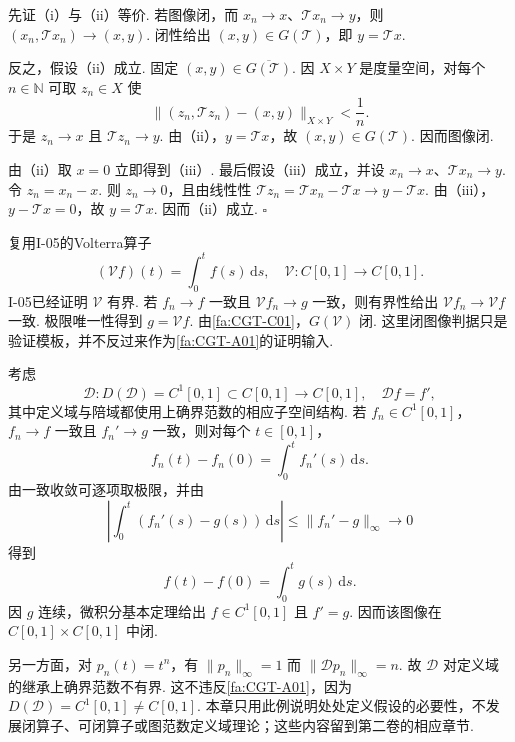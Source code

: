\begin{FAProof}
先证（i）与（ii）等价. 若图像闭，而 \(\displaystyle x_n\to x\)、\(\displaystyle \mathcal T x_n\to y\)，则 \(\displaystyle (x_n,\mathcal T x_n)\to(x,y)\). 闭性给出 \(\displaystyle (x,y)\in G(\mathcal T)\)，即 \(\displaystyle y=\mathcal T x\).

反之，假设（ii）成立. 固定 \(\displaystyle (x,y)\in\overline{G(\mathcal T)}\). 因 \(\displaystyle X\times Y\) 是度量空间，对每个 \(\displaystyle n\in\mathbb N\) 可取 \(\displaystyle z_n\in X\) 使
\[
\|(z_n,\mathcal T z_n)-(x,y)\|_{X\times Y}<\frac{1}{n}.
\]
于是 \(\displaystyle z_n\to x\) 且 \(\displaystyle \mathcal T z_n\to y\). 由（ii），\(\displaystyle y=\mathcal T x\)，故 \(\displaystyle (x,y)\in G(\mathcal T)\). 因而图像闭.

由（ii）取 \(\displaystyle x=0\) 立即得到（iii）. 最后假设（iii）成立，并设 \(\displaystyle x_n\to x\)、\(\displaystyle \mathcal T x_n\to y\). 令 \(\displaystyle z_n=x_n-x\). 则 \(\displaystyle z_n\to0\)，且由线性性
\(\displaystyle \mathcal T z_n =\mathcal T x_n-\mathcal T x \to y-\mathcal T x\).
由（iii），\(\displaystyle y-\mathcal T x=0\)，故 \(\displaystyle y=\mathcal T x\). 因而（ii）成立.
\hfill\(\square\)
\end{FAProof}

\begin{FAApplication}[Volterra算子的闭图像]\label{i09:ex-cont-closed-graph}
复用I-05的Volterra算子
\[
(\mathcal V f)(t)=\int_0^t f(s)\,\mathrm{d}s,
\quad
\mathcal V:C[0,1]\to C[0,1].
\]
I-05已经证明 \(\displaystyle \mathcal V\) 有界. 若 \(\displaystyle f_n\to f\) 一致且 \(\displaystyle \mathcal V f_n\to g\) 一致，则有界性给出 \(\displaystyle \mathcal V f_n\to\mathcal V f\) 一致. 极限唯一性得到 \(\displaystyle g=\mathcal V f\). 由\autoref{fa:CGT-C01}，\(\displaystyle G(\mathcal V)\) 闭. 这里闭图像判据只是验证模板，并不反过来作为\autoref{fa:CGT-A01}的证明输入.
\end{FAApplication}

\begin{FAWarning}[处处定义条件不可删除]\label{i09:derivative-domain-warning}
考虑
\[
\mathcal D:D(\mathcal D)=C^1[0,1]\subset C[0,1]\to C[0,1],
\quad
\mathcal Df=f',
\]
其中定义域与陪域都使用上确界范数的相应子空间结构. 若 \(\displaystyle f_n\in C^1[0,1]\)，\(\displaystyle f_n\to f\) 一致且 \(\displaystyle f_n'\to g\) 一致，则对每个 \(\displaystyle t\in[0,1]\)，
\[
f_n(t)-f_n(0)=\int_0^t f_n'(s)\,\mathrm{d}s.
\]
由一致收敛可逐项取极限，并由
\[
\left|\int_0^t(f_n'(s)-g(s))\,\mathrm{d}s\right|
\leqslant\|f_n'-g\|_\infty
\to0
\]
得到
\[
f(t)-f(0)=\int_0^t g(s)\,\mathrm{d}s.
\]
因 \(\displaystyle g\) 连续，微积分基本定理给出 \(\displaystyle f\in C^1[0,1]\) 且 \(\displaystyle f'=g\). 因而该图像在 \(\displaystyle C[0,1]\times C[0,1]\) 中闭.

另一方面，对 \(\displaystyle p_n(t)=t^n\)，有 \(\displaystyle \|p_n\|_\infty=1\) 而 \(\displaystyle \|\mathcal Dp_n\|_\infty=n\). 故 \(\displaystyle \mathcal D\) 对定义域的继承上确界范数不有界. 这不违反\autoref{fa:CGT-A01}，因为 \(\displaystyle D(\mathcal D)=C^1[0,1]\neq C[0,1]\). 本章只用此例说明处处定义假设的必要性，不发展闭算子、可闭算子或图范数定义域理论；这些内容留到第二卷的相应章节.
\end{FAWarning}

